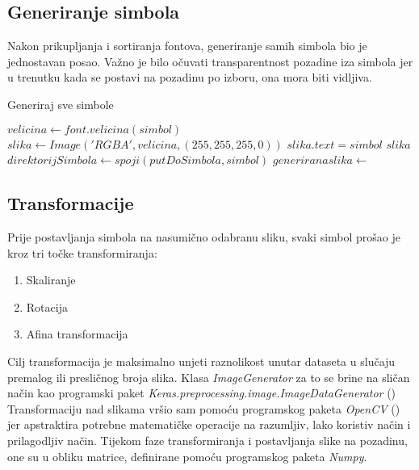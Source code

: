 \subsection{Generiranje simbola}
Nakon prikupljanja i sortiranja fontova, generiranje samih simbola bio je jednostavan posao.
Važno je bilo očuvati transparentnost pozadine iza simbola jer u trenutku kada se postavi na pozadinu po izboru, ona mora biti vidljiva.
\begin{algorithm}
\caption{Generiraj sve simbole}
\begin{algorithmic}[1]
		\State $velicina \gets font.velicina(simbol)$
		\State $slika \gets Image('RGBA', velicina, (255, 255, 255, 0))$
		\State $slika.text = simbol$
		\State \Return $slika$
	\EndFunction
				\State $direktorijSimbola \leftarrow spoji(putDoSimbola, simbol)$
					\State {}
				\EndIf
				\State $generirana slika \gets$ 
				\State {}
			\EndFor
		\EndFor
	\EndFunction
\end{algorithmic}
\end{algorithm}

\subsection{Transformacije}
Prije postavljanja simbola na nasumično odabranu sliku, svaki simbol prošao je kroz tri točke transformiranja:
\begin{enumerate}
\item Skaliranje
\item Rotacija
\item Afina transformacija
\end{enumerate}
Cilj transformacija je maksimalno unjeti raznolikost unutar dataseta u slučaju premalog ili presličnog broja slika.
Klasa \emph{ImageGenerator} za to se brine na sličan način kao programski paket \emph{Keras.preprocessing.image.ImageDataGenerator} (\cite{Keras.io})
Transformaciju nad slikama vršio sam pomoću programskog paketa \emph{OpenCV} (\cite{OpenCV}) jer apstraktira potrebne matematičke operacije na razumljiv, lako koristiv način i prilagodljiv način.
Tijekom faze transformiranja i postavljanja slike na pozadinu, one su u obliku matrice, definirane pomoću programskog paketa \emph{Numpy}.
